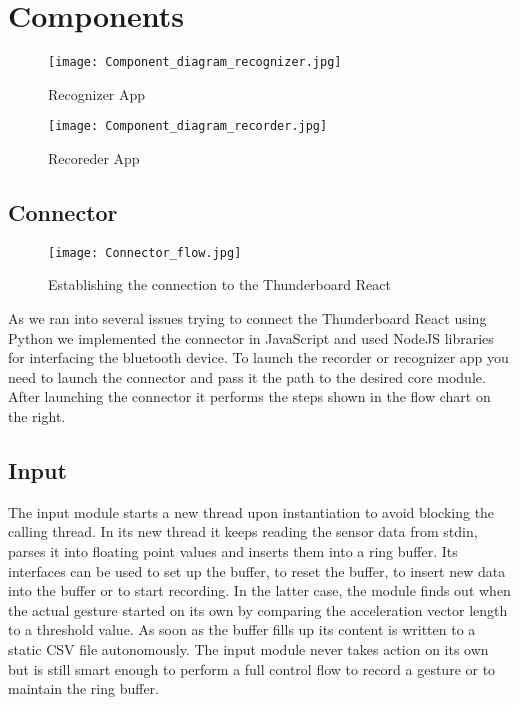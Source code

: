 \section{Components}
\label{ch:SystemDesign:sec:Components}

\begin{figure}[htp]
\begin{center}
  \texttt{[image: Component\_diagram\_recognizer.jpg]}
\caption{Recognizer App}
\end{center}
\end{figure} 

\begin{figure}[htp]
\begin{center}
  \texttt{[image: Component\_diagram\_recorder.jpg]}
\caption{Recoreder App}
\end{center}
\end{figure} 

\newpage

\subsection{Connector}
\label{ch:SystemDesign:sec:Components:sub:Connector}

\begin{wrapfigure}{R}{0.5\textwidth}
\centering
\texttt{[image: Connector\_flow.jpg]}
\caption{Establishing the connection to the Thunderboard React}\label{fig:flow_chart}
\end{wrapfigure}
As we ran into several issues trying to connect the Thunderboard React using Python we implemented the connector in JavaScript and used NodeJS libraries for interfacing the bluetooth device. To launch the recorder or recognizer app you need to launch the connector and pass it the path to the desired core module. After launching the connector it performs the steps shown in the flow chart on the right.

\subsection{Input}
\label{ch:SystemDesign:sec:Components:sub:Input}

The input module starts a new thread upon instantiation to avoid blocking the calling thread. In its new thread it keeps reading the sensor data from stdin, parses it into floating point values and inserts them into a ring buffer. Its interfaces can be used to set up the buffer, to reset the buffer, to insert new data into the buffer or to start recording.  In the latter case, the module finds out when the actual gesture started on its own by comparing the acceleration vector length to a threshold value. As soon as the buffer fills up its content is written to a static CSV file autonomously. The input module never takes action on its own but is still smart enough to perform a full control flow to record a gesture or to maintain the ring buffer.

